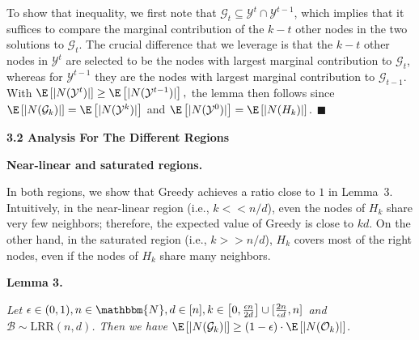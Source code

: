 \documentclass[10pt,a4paper]{article}
\begin{document}
To show that inequality, we first note that $\mathcal{G}_{t}\subseteq\mathcal{Y}^{t}\cap\mathcal{Y}^{t-1}$, which implies that it suffices to compare the marginal contribution of the $k-t$ other nodes in the two solutions to $\mathcal{G}_{t}$. The crucial difference that we leverage is that the $k-t$ other nodes in $\mathcal{Y}^{t}$ are selected to be the nodes with largest marginal contribution to $\mathcal{G}_{t}$, whereas for $\mathcal{Y}^{t-1}$ they are the nodes with largest marginal contribution to $\mathcal{G}_{t-1}$. With $\E\left[|N(\mathcal{Y}^{t})|\right]\geq\E\left[|N(\mathcal{Y}^{t-1})|\right],$
the lemma then follows since $\E\left[|N(\mathcal{G}_{k})|\right]=\E\left[|N(\mathcal{Y}^{k})|\right]$ and $\E\left[|N(\mathcal{Y}^{0})|\right]=\E\left[|N(H_{k})|\right].$
\ensuremath{\blacksquare}\par







\par\medskip\noindent\textbf{3.2 Analysis For The Different Regions}\par




\par\medskip\noindent\textbf{Near-linear and saturated regions.}\par




In both regions, we show that Greedy achieves a ratio close to $1$ in Lemma 3.
Intuitively, in the near-linear region (i.e., $k<<n/d$), even the nodes of $H_{k}$ share very few neighbors; therefore, the expected value of Greedy is close to $kd$. On the other hand, in the saturated region (i.e., $k>>n/d$), $H_{k}$ covers most of the right nodes, even if the nodes of $H_{k}$ share many neighbors.\par





\par\medskip\noindent\textbf{\textbf{Lemma 3}\textbf{.}}\par



\emph{Let $\epsilon\in(0,1),n\in\mathbbm{N},d\in[n],k\in\left[0,\frac{\epsilon n}{2d}\right]\cup[\frac{2n}{\epsilon d},n]$ and $\mathcal{B}\sim\text{{LRR}}(n,d)$.
Then we have $\E\left[|N(\mathcal{G}_{k})|\right]\geq\left(1-\epsilon\right)\cdot\E\left[|N(\mathcal{O}_{k})|\right]$.}\par
\end{document}
